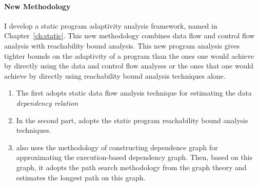\paragraph{New Methodology}
I develop a static program adaptivity analysis framework, named {\THESYSTEM} in Chapter~\ref{ch:static}.
This new methodology combines data flow and control flow analysis with reachability bound analysis.
This new program analysis gives tighter bounds on the adaptivity of a program than the ones one would achieve 
by directly using the data and control flow analyses or the ones that one would achieve 
by directly using reachability bound analysis techniques alone. 
\begin{enumerate}
\item The {\THESYSTEM} first adopts static data flow analysis technique for estimating the data \emph{dependency relation}
\item In the second part, {\THESYSTEM} adopts the static program reachability bound analysis techniques.
\item 
{\THESYSTEM} also uses the methodology of constructing dependence graph for approximating the execution-based dependency graph.
Then, based on this graph, {\THESYSTEM} 
it adopts the path search methodology from the graph theory and estimates the longest path on this graph.
\end{enumerate}